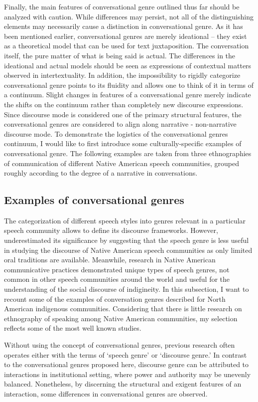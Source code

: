 \documentclass[12pt, draft]{article}
\begin{document}
Finally, the main features of conversational genre outlined thus far should be analyzed with caution. While differences may persist, not all of the distinguishing elements may necessarily cause a distinction in conversational genre. As it has been mentioned earlier, conversational genres are merely ideational -- they exist as a theoretical model that can be used for text juxtaposition. The conversation itself, the pure matter of what is being said is actual. The differences in the ideational and actual models should be seen as expressions of contextual matters observed in intertextuality. In addition, the impossibility to rigidly categorize conversational genre points to its fluidity and allows one to think of it in terms of a continuum. Slight changes in features of a conversational genre merely indicate the shifts on the continuum rather than completely new discourse expressions. Since discourse mode is considered one of the primary structural features, the conversational genres are considered to align along narrative - non-narrative discourse mode. To demonstrate the logistics of the conversational genres continuum, I would like to first introduce some culturally-specific examples of conversational genre. The following examples are taken from three ethnographies of communication of different Native American speech communities, grouped roughly according to the degree of a narrative in conversations. 
\subsection{Examples of conversational genres}
The categorization of different speech styles into genres relevant in a particular speech community allows to define its discourse frameworks. However, \textcite[p. 102]{dementyev2015} underestimated its significance by suggesting that the speech genre is less useful in studying the discourse of Native American speech communities as only limited oral traditions are available. Meanwhile, research in Native American communicative practices demonstrated unique types of speech genres, not common in other speech communities around the world and useful for the understanding of the social discourse of indigineity. In this subsection, I want to recount some of the examples of conversation genres described for North American indigenous communities. Considering that there is little research on ethnography of speaking among Native American communities, my selection reflects some of the most well known studies.

Without using the concept of conversational genres, previous research often operates either with the terms of `speech genre' or `discourse genre.' In contrast to the conversational genres proposed here, discourse genre can be attributed to interactions in institutional setting, where power and authority may be unevenly balanced. Nonetheless, by discerning the structural and exigent features of an interaction, some differences in conversational genres are observed. 
\end{document}
